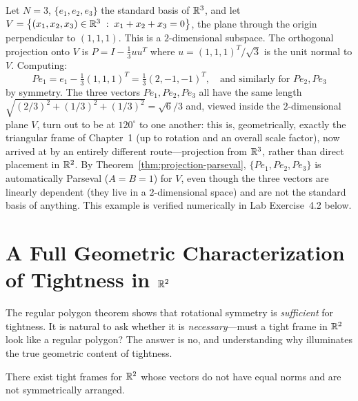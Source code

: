\begin{examplebox}[title={Example 4.2: A Parseval frame from projecting $\R^3$ onto $\R^2$}]
\label{ex:parseval-projection-example}
Let $N=3$, $\{e_1,e_2,e_3\}$ the standard basis of $\R^3$, and let
$V = \left\{ (x_1,x_2,x_3)\in\mathbb{R}^3 \;:\; x_1+x_2+x_3=0 \right\}$, the plane through the
origin perpendicular to $(1,1,1)$. This is a $2$-dimensional subspace.
The orthogonal projection onto $V$ is $P = I - \tfrac13 uu^T$ where
$u=(1,1,1)^T/\sqrt3$ is the unit normal to $V$. Computing:
\[
  Pe_1 = e_1 - \tfrac13(1,1,1)^T = \tfrac13(2,-1,-1)^T, \quad\text{and similarly for } Pe_2, Pe_3
\]
by symmetry. The three vectors $Pe_1, Pe_2, Pe_3$ all have the same
length $\sqrt{(2/3)^2+(1/3)^2+(1/3)^2}=\sqrt{6}/3$ and, viewed inside the
$2$-dimensional plane $V$, turn out to be at $120^\circ$ to one another:
this is, geometrically, exactly the triangular frame of
Chapter~1 (up to rotation and an overall scale factor), now arrived at
by an entirely different route---projection from $\R^3$, rather than
direct placement in $\R^2$. By Theorem~\ref{thm:projection-parseval},
$\{Pe_1,Pe_2,Pe_3\}$ is automatically Parseval ($A=B=1$) for $V$, even
though the three vectors are linearly dependent (they live in a
$2$-dimensional space) and are not the standard basis of anything. This
example is verified numerically in Lab Exercise~4.2 below.
\end{examplebox}

\section{A Full Geometric Characterization of Tightness in $\R^2$}
\label{sec:geometric-characterization}

The regular polygon theorem shows that rotational symmetry is
\emph{sufficient} for tightness. It is natural to ask whether it is
\emph{necessary}---must a tight frame in $\R^2$ look like a regular
polygon? The answer is no, and understanding why illuminates the true
geometric content of tightness.

\begin{proposition}
\label{prop:tight-not-regular}
There exist tight frames for $\R^2$ whose vectors do not have equal
norms and are not symmetrically arranged.
\end{proposition}

